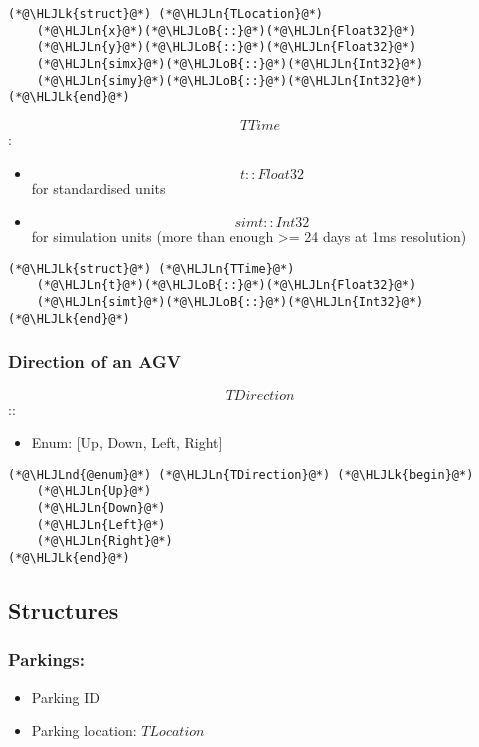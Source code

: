 \documentclass[12pt,a4paper]{article}
\newcommand{\HLJLk}[1]{\textcolor[RGB]{148,91,176}{\textbf{#1}}}
\newcommand{\HLJLn}[1]{#1}
\newcommand{\HLJLnd}[1]{\textcolor[RGB]{214,102,97}{#1}}
\newcommand{\HLJLoB}[1]{\textcolor[RGB]{102,102,102}{\textbf{#1}}}
\begin{document}
\begin{lstlisting}
(*@\HLJLk{struct}@*) (*@\HLJLn{TLocation}@*)
    (*@\HLJLn{x}@*)(*@\HLJLoB{::}@*)(*@\HLJLn{Float32}@*)
    (*@\HLJLn{y}@*)(*@\HLJLoB{::}@*)(*@\HLJLn{Float32}@*)
    (*@\HLJLn{simx}@*)(*@\HLJLoB{::}@*)(*@\HLJLn{Int32}@*)
    (*@\HLJLn{simy}@*)(*@\HLJLoB{::}@*)(*@\HLJLn{Int32}@*)
(*@\HLJLk{end}@*)
\end{lstlisting}


\[
TTime
\]
:

\begin{itemize}
\item \[
t:: Float32
\]
for standardised units


\item \[
simt::Int32
\]
for simulation units (more than enough >= 24 days at 1ms resolution)

\end{itemize}

\begin{lstlisting}
(*@\HLJLk{struct}@*) (*@\HLJLn{TTime}@*)
    (*@\HLJLn{t}@*)(*@\HLJLoB{::}@*)(*@\HLJLn{Float32}@*)
    (*@\HLJLn{simt}@*)(*@\HLJLoB{::}@*)(*@\HLJLn{Int32}@*)
(*@\HLJLk{end}@*)
\end{lstlisting}


\subsubsection{Direction of an AGV}
\[
TDirection
\]
::

\begin{itemize}
\item Enum: [Up, Down, Left, Right]

\end{itemize}

\begin{lstlisting}
(*@\HLJLnd{@enum}@*) (*@\HLJLn{TDirection}@*) (*@\HLJLk{begin}@*)
    (*@\HLJLn{Up}@*)
    (*@\HLJLn{Down}@*)
    (*@\HLJLn{Left}@*)
    (*@\HLJLn{Right}@*)
(*@\HLJLk{end}@*)
\end{lstlisting}


\subsection{Structures}
\subsubsection{Parkings:}
\begin{itemize}
\item Parking ID


\item Parking location: $TLocation$

\end{itemize}
\end{document}
